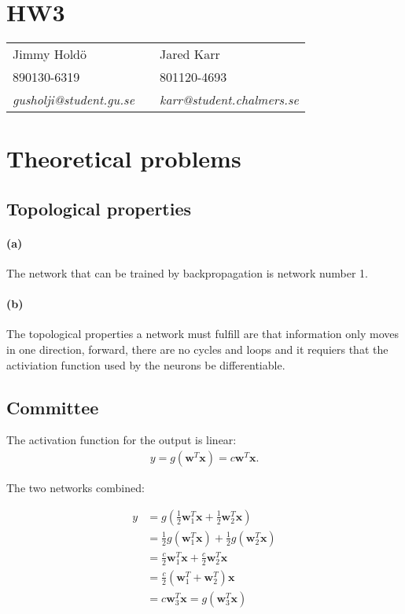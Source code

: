 \documentclass[a4paper,11pt]{article}
\begin{document}
	\section*{HW3}

	\begin{tabular*}{0.9\textwidth}{@{\extracolsep{\fill} } lll}
		Jimmy Hold\"{o} & & Jared Karr\\
		890130-6319 & & 801120-4693\\
		\it{gusholji@student.gu.se} & & \it{karr@student.chalmers.se}\\
	\end{tabular*}

	\section{Theoretical problems}
	\subsection{Topological properties}
	\paragraph{(a)}
	 The network that can be trained by backpropagation is network number 1.
	\paragraph{(b)}
	The topological properties a network must fulfill are that information only moves in one direction, forward, there are no cycles and loops and it requiers that the activiation function used by the neurons be differentiable.

	\subsection{Committee}
	The activation function for the output is linear:
	\begin{align*}
		y = g(\bm{w}^T\bm{x}) = c \bm{w}^T \bm{x}.
	\end{align*}

	\noindent The two networks combined:

	\begin{align*}
	 y &=g(\frac{1}{2} \bm{w}_1^T \bm{x}+\frac{1}{2} \bm{w}_2^{T} \bm{x})\\
	 &= \frac{1}{2}g(\bm{w}_1^T \bm{x})+\frac{1}{2}g(\bm{w}_2^T \bm{x})\\
	 &=	\frac{c}{2}\bm{w}_1^T\bm{x}+\frac{c}{2}\bm{w}_2^T\bm{x} \\
	 &= \frac{c}{2}(\bm{w}_1^T+\bm{w}_2^T)\bm{x}\\
	 &= c \bm{w}_3^T \bm{x} = g(\bm{w}_3^T\bm{x})
	\end{align*}
\end{document}
